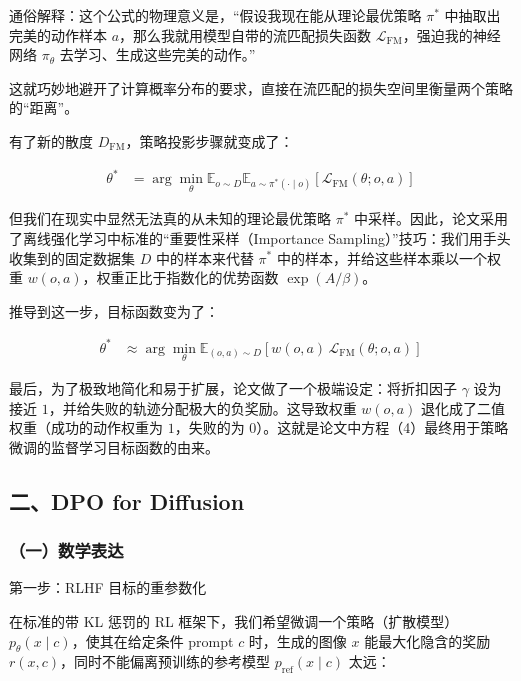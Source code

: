 通俗解释：这个公式的物理意义是，``假设我现在能从理论最优策略 \(\pi^{*}\) 中抽取出完美的动作样本 \(a\)，那么我就用模型自带的流匹配损失函数 \(\mathcal{L}_{\mathrm{FM}}\)，强迫我的神经网络 \(\pi_\theta\) 去学习、生成这些完美的动作。''

这就巧妙地避开了计算概率分布的要求，直接在流匹配的损失空间里衡量两个策略的``距离''。

有了新的散度 \(D_{\mathrm{FM}}\)，策略投影步骤就变成了：

\[
\begin{aligned}
\theta^{*}
&= \arg\min_\theta
\mathbb{E}_{o \sim D}
\mathbb{E}_{a \sim \pi^{*}(\cdot \mid o)}
\left[
\mathcal{L}_{\mathrm{FM}}(\theta; o, a)
\right]
\end{aligned}
\]

但我们在现实中显然无法真的从未知的理论最优策略 \(\pi^{*}\) 中采样。因此，论文采用了离线强化学习中标准的``重要性采样（Importance Sampling）''技巧：我们用手头收集到的固定数据集 \(D\) 中的样本来代替 \(\pi^{*}\) 中的样本，并给这些样本乘以一个权重 \(w(o, a)\)，权重正比于指数化的优势函数 \(\exp(A / \beta)\)。

推导到这一步，目标函数变为了：

\[
\begin{aligned}
\theta^{*}
&\approx \arg\min_\theta
\mathbb{E}_{(o,a) \sim D}
\left[
w(o, a)\,\mathcal{L}_{\mathrm{FM}}(\theta; o, a)
\right]
\end{aligned}
\]

最后，为了极致地简化和易于扩展，论文做了一个极端设定：将折扣因子 \(\gamma\) 设为接近 \(1\)，并给失败的轨迹分配极大的负奖励。这导致权重 \(w(o, a)\) 退化成了二值权重（成功的动作权重为 \(1\)，失败的为 \(0\)）。这就是论文中方程（4）最终用于策略微调的监督学习目标函数的由来。

\hypertarget{ux4e8cdpo-for-diffusion}{%
\subsection{二、DPO for Diffusion}\label{ux4e8cdpo-for-diffusion}}

\hypertarget{ux4e00ux6570ux5b66ux8868ux8fbe}{%
\subsubsection{（一）数学表达}\label{ux4e00ux6570ux5b66ux8868ux8fbe}}

第一步：RLHF 目标的重参数化

在标准的带 KL 惩罚的 RL 框架下，我们希望微调一个策略（扩散模型）\(p_\theta(x\mid c)\)，使其在给定条件 prompt \(c\) 时，生成的图像 \(x\) 能最大化隐含的奖励 \(r(x,c)\)，同时不能偏离预训练的参考模型 \(p_{\mathrm{ref}}(x\mid c)\) 太远：

